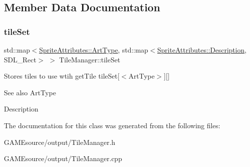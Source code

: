 \subsection{Member Data Documentation}
\mbox{\label{class_tile_manager_a0ac2270018950604d7f6c817cc17434d}} 
\subsubsection{\texorpdfstring{tile\+Set}{tileSet}}
{\footnotesize\ttfamily std\+::map$<$\mbox{\hyperlink{namespace_sprite_attributes_afb5447c311bc29f0ce8ddfd025c6e998}{Sprite\+Attributes\+::\+Art\+Type}}, std\+::map$<$\mbox{\hyperlink{namespace_sprite_attributes_a3ece96d6288b14d53d84e2138392395c}{Sprite\+Attributes\+::\+Description}}, S\+D\+L\+\_\+\+Rect$>$ $>$ Tile\+Manager\+::tile\+Set\hspace{0.3cm}{\ttfamily [protected]}}

Stores tiles to use wtih get\+Tile tile\+Set\mbox{[}$<$\+Art\+Type$>$\mbox{]}\mbox{[}\mbox{]} \begin{DoxySeeAlso}{See also}
Art\+Type 

Description 
\end{DoxySeeAlso}


The documentation for this class was generated from the following files\+:\begin{DoxyCompactItemize}
\item 
G\+A\+M\+Esource/output/Tile\+Manager.\+h\item 
G\+A\+M\+Esource/output/Tile\+Manager.\+cpp\end{DoxyCompactItemize}
